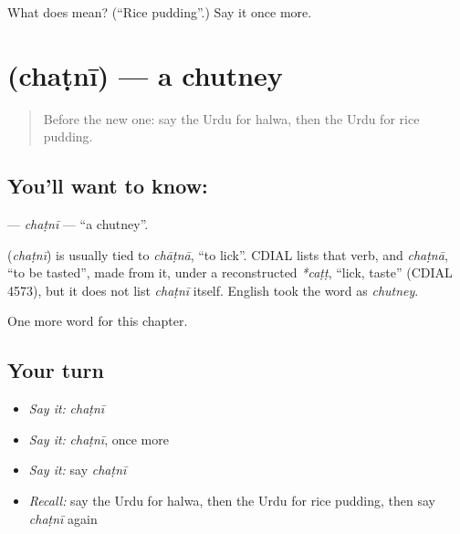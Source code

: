 \begin{tcolorbox}[breakable,colback=teal!4,colframe=teal!35!black,title={Before you move on}]
What does  mean? (\textquotedblleft{}Rice pudding\textquotedblright{}.) Say it once more.
\end{tcolorbox}
\section[\texorpdfstring{\ur{چٹنی} (chaṭnī)}{چٹنی (chaṭnī)}]{ (chaṭnī) — a chutney}

\label{lesson:UR-C120-chatni}



\begin{quote}
Before the new one: say the Urdu for halwa, then the Urdu for rice pudding.
\end{quote}

\subsection*{You'll want to know: }
\textbf{} — \emph{chaṭnī} — \textquotedblleft{}a chutney\textquotedblright{}.

\begin{cousinweb}
\textbf{} (\emph{chaṭnī}) is usually tied to \emph{chāṭnā}, \textquotedblleft{}to lick\textquotedblright{}. CDIAL lists that verb, and \emph{chaṭnā}, \textquotedblleft{}to be tasted\textquotedblright{}, made from it, under a reconstructed \emph{*caṭṭ}, \textquotedblleft{}lick, taste\textquotedblright{} (CDIAL 4573), but it does not list \emph{chaṭnī} itself. English took the word as \emph{chutney}.
\end{cousinweb}

\begin{grammarlens}[title={What you've built}]
One more word for this chapter.
\end{grammarlens}

\subsection*{Your turn}
\begin{itemize}
\raggedright
  \item \emph{Say it:} \emph{chaṭnī}
  \item \emph{Say it:} \emph{chaṭnī}, once more
  \item \emph{Say it:} say \emph{chaṭnī}
  \item \emph{Recall:} say the Urdu for halwa, then the Urdu for rice pudding, then say \emph{chaṭnī} again
\end{itemize}


